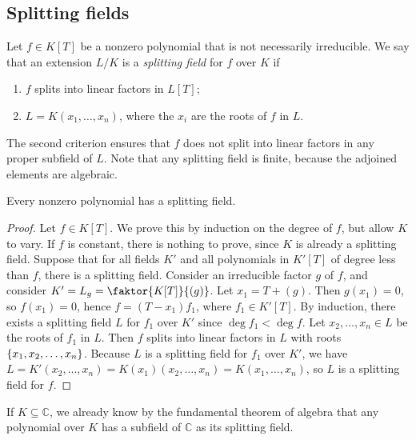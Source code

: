\subsection{Splitting fields}
\begin{definition}
	Let \( f \in K[T] \) be a nonzero polynomial that is not necessarily irreducible.
	We say that an extension \( L / K \) is a \emph{splitting field} for \( f \) over \( K \) if
	\begin{enumerate}
		\item \( f \) splits into linear factors in \( L[T] \);
		\item \( L = K(x_1, \dots, x_n) \), where the \( x_i \) are the roots of \( f \) in \( L \).
	\end{enumerate}
\end{definition}
\begin{remark}
	The second criterion ensures that \( f \) does not split into linear factors in any proper subfield of \( L \).
	Note that any splitting field is finite, because the adjoined elements are algebraic.
\end{remark}
\begin{theorem}
	Every nonzero polynomial has a splitting field.
\end{theorem}
\begin{proof}
	Let \( f \in K[T] \).
	We prove this by induction on the degree of \( f \), but allow \( K \) to vary.
	If \( f \) is constant, there is nothing to prove, since \( K \) is already a splitting field.
	Suppose that for all fields \( K' \) and all polynomials in \( K'[T] \) of degree less than \( f \), there is a splitting field.
	Consider an irreducible factor \( g \) of \( f \), and consider \( K' = L_g = \faktor{K[T]}{(g)} \).
	Let \( x_1 = T + (g) \).
	Then \( g(x_1) = 0 \), so \( f(x_1) = 0 \), hence \( f = (T - x_1)f_1 \), where \( f_1 \in K'[T] \).
	By induction, there exists a splitting field \( L \) for \( f_1 \) over \( K' \) since \( \deg f_1 < \deg f \).
	Let \( x_2, \dots, x_n \in L \) be the roots of \( f_1 \) in \( L \).
	Then \( f \) splits into linear factors in \( L \) with roots \( \qty{x_1, x_2, \dots, x_n} \).
	Because \( L \) is a splitting field for \( f_1 \) over \( K' \), we have \( L = K'(x_2, \dots, x_n) = K(x_1)(x_2, \dots, x_n) = K(x_1, \dots, x_n) \), so \( L \) is a splitting field for \( f \).
\end{proof}
\begin{remark}
	If \( K \subseteq \mathbb C \), we already know by the fundamental theorem of algebra that any polynomial over \( K \) has a subfield of \( \mathbb C \) as its splitting field.
\end{remark}
